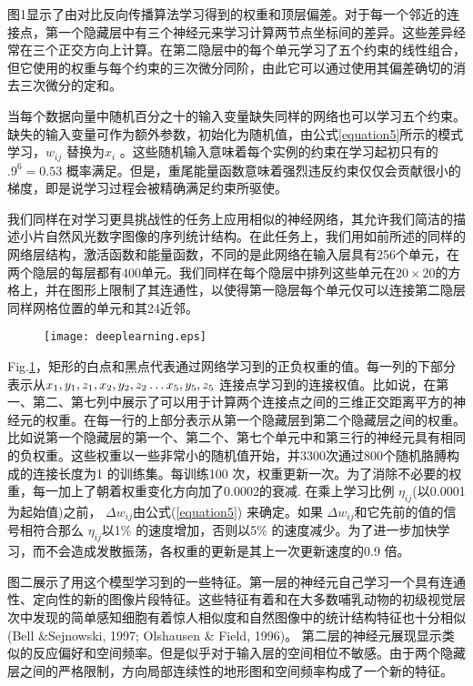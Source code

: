 \par{图1显示了由对比反向传播算法学习得到的权重和顶层偏差。对于每一个邻近的连接点，第一个隐藏层中有三个神经元来学习计算两节点坐标间的差异。这些差异经常在三个正交方向上计算。在第二隐层中的每个单元学习了五个约束的线性组合，但它使用的权重与每个约束的三次微分同阶，由此它可以通过使用其偏差确切的消去三次微分的定和。}
\par{当每个数据向量中随机百分之十的输入变量缺失同样的网络也可以学习五个约束。缺失的输入变量可作为额外参数，初始化为随机值，由公式\ref{equation5}所示的模式学习，${w_{ij}}$ 替换为${x_i}$ 。这些随机输入意味着每个实例的约束在学习起初只有的 ${.9^6} = 0.53$ 概率满足。但是，重尾能量函数意味着强烈违反约束仅仅会贡献很小的梯度，即是说学习过程会被精确满足约束所驱使。}
\par{我们同样在对学习更具挑战性的任务上应用相似的神经网络，其允许我们简洁的描述小片自然风光数字图像的序列统计结构。在此任务上，我们用如前所述的同样的网络层结构，激活函数和能量函数，不同的是此网络在输入层具有256个单元，在两个隐层的每层都有400单元。我们同样在每个隐层中排列这些单元在$20 \times 20 $的方格上，并在图形上限制了其连通性，以使得第一隐层每个单元仅可以连接第二隐层同样网格位置的单元和其24近邻。
\begin{figure}[htbp]
\centering
\texttt{[image: deeplearning.eps]}
\label{fig:deeplearning}
\vspace{\baselineskip} %
\end{figure}}
\par{
\footnotesize
 Fig.\ref{fig:deeplearning}，矩形的白点和黑点代表通过网络学习到的正负权重的值。每一列的下部分表示从${x_1},{\rm{ }}{y_1},{\rm{ }}{z_1},{\rm{ }}{x_2},{\rm{ }}{y_2},{\rm{ }}{z_2} \ldots {x_5},{\rm{ }}{y_5},{\rm{ }}{z_5}$ 连接点学习到的连接权值。比如说，在第一、第二、第七列中展示了可以用于计算两个连接点之间的三维正交距离平方的神经元的权重。在每一行的上部分表示从第一个隐藏层到第二个隐藏层之间的权重。比如说第一个隐藏层的第一个、第二个、第七个单元中和第三行的神经元具有相同的负权重。这些权重以一些非常小的随机值开始，并3300次通过800个随机胳膊构成的连接长度为1 的训练集。每训练100 次，权重更新一次。为了消除不必要的权重，每一加上了朝着权重变化方向加了0.0002的衰减. 在乘上学习比例 ${\eta _{ij}}$(以0.0001为起始值)之前， $\Delta {w_{ij}}$由公式(\ref{equation5}) 来确定。如果 $\Delta {w_{ij}}$和它先前的值的信号相符合那么 ${\eta _{ij}}$以1\% 的速度增加，否则以5\% 的速度减少。为了进一步加快学习，而不会造成发散振荡，各权重的更新是其上一次更新速度的0.9 倍。}

\par{图二展示了用这个模型学习到的一些特征。第一层的神经元自己学习一个具有连通性、定向性的新的图像片段特征。这些特征有着和在大多数哺乳动物的初级视觉层次中发现的简单感知细胞有着惊人相似度和自然图像中的统计结构特征也十分相似(Bell \&Sejnowski, 1997; Olshausen \& Field, 1996)。 第二层的神经元展现显示类似的反应偏好和空间频率。但是似乎对于输入层的空间相位不敏感。由于两个隐藏层之间的严格限制，方向局部连续性的地形图和空间频率构成了一个新的特征。}

